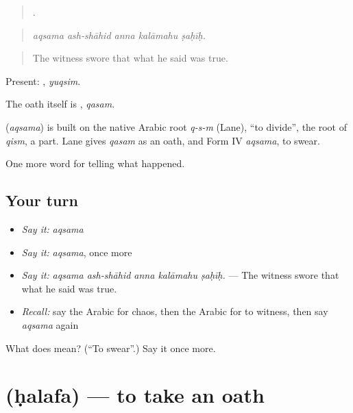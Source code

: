 \begin{quote}
    .
\end{quote}

\begin{quote}
\emph{aqsama ash-shāhid anna kalāmahu ṣaḥīḥ.}
\end{quote}

\begin{quote}
The witness swore that what he said was true.
\end{quote}

Present: , \emph{yuqsim}.

The oath itself is , \emph{qasam}.

\begin{cousinweb}
\textbf{} (\emph{aqsama}) is built on the native Arabic root \emph{q-s-m} (Lane), \textquotedblleft{}to divide\textquotedblright{}, the root of \emph{qism}, a part. Lane gives \emph{qasam} as an oath, and Form IV \emph{aqsama}, to swear.
\end{cousinweb}

\begin{grammarlens}[title={What you've built}]
One more word for telling what happened.
\end{grammarlens}

\subsection*{Your turn}
\begin{itemize}
\raggedright
  \item \emph{Say it:} \emph{aqsama}
  \item \emph{Say it:} \emph{aqsama}, once more
  \item \emph{Say it:} \emph{aqsama ash-shāhid anna kalāmahu ṣaḥīḥ.} — The witness swore that what he said was true.
  \item \emph{Recall:} say the Arabic for chaos, then the Arabic for to witness, then say \emph{aqsama} again
\end{itemize}

\begin{tcolorbox}[breakable,colback=teal!4,colframe=teal!35!black,title={Before you move on}]
What does  mean? (\textquotedblleft{}To swear\textquotedblright{}.) Say it once more.
\end{tcolorbox}
\section[\texorpdfstring{\ar{حلف} (ḥalafa)}{حلف (ḥalafa)}]{ (ḥalafa) — to take an oath}

